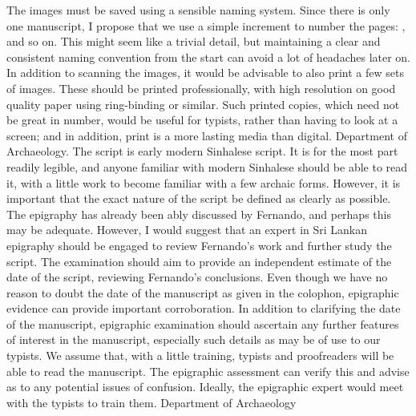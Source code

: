 {}The images must be saved using a sensible naming system. Since there is only one manuscript, I propose that we use a simple increment to number the pages: ,  and so on. This might seem like a trivial detail, but maintaining a clear and consistent naming convention from the start can avoid a lot of headaches later on.\markdownRendererInterblockSeparator
{}In addition to scanning the images, it would be advisable to also print a few sets of images. These should be printed professionally, with high resolution on good quality paper using ring-binding or similar. Such printed copies, which need not be great in number, would be useful for typists, rather than having to look at a screen; and in addition, print is a more lasting media than digital.\markdownRendererInterblockSeparator
{}\markdownRendererBlockQuoteBegin
{} Department of Archaeology.
\markdownRendererBlockQuoteEnd \markdownRendererInterblockSeparator
{}\markdownRendererInterblockSeparator
{}The script is early modern Sinhalese script. It is for the most part readily legible, and anyone familiar with modern Sinhalese should be able to read it, with a little work to become familiar with a few archaic forms. However, it is important that the exact nature of the script be defined as clearly as possible. The epigraphy has already been ably discussed by Fernando, and perhaps this may be adequate. However, I would suggest that an expert in Sri Lankan epigraphy should be engaged to review Fernando’s work and further study the script.\markdownRendererInterblockSeparator
{}The examination should aim to provide an independent estimate of the date of the script, reviewing Fernando’s conclusions. Even though we have no reason to doubt the date of the manuscript as given in the colophon, epigraphic evidence can provide important corroboration.\markdownRendererInterblockSeparator
{}In addition to clarifying the date of the manuscript, epigraphic examination should ascertain any further features of interest in the manuscript, especially such details as may be of use to our typists. We assume that, with a little training, typists and proofreaders will be able to read the manuscript. The epigraphic assessment can verify this and advise as to any potential issues of confusion. Ideally, the epigraphic expert would meet with the typists to train them.\markdownRendererInterblockSeparator
{}\markdownRendererBlockQuoteBegin
{} Department of Archaeology
